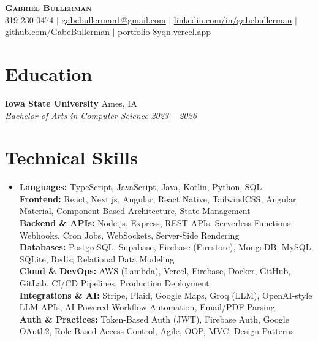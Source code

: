 \documentclass[letterpaper,10.5pt]{article}
\begin{document}
\begin{center}
  {\Huge \scshape \textbf{Gabriel Bullerman}} \\[3pt]
  \small
  319-230-0474 $|$
  \href{mailto:gabebullerman1@gmail.com}{\underline{gabebullerman1@gmail.com}} $|$
  \href{https://linkedin.com/in/gabebullerman}{\underline{linkedin.com/in/gabebullerman}} $|$
  \href{https://github.com/GabeBullerman}{\underline{github.com/GabeBullerman}} $|$
  \href{https://portfolio-8yqn.vercel.app/}{\underline{portfolio-8yqn.vercel.app}}
\end{center}

\vspace{-2pt}

\section{Education}
\textbf{Iowa State University} \hfill Ames, IA \\
\textit{Bachelor of Arts in Computer Science} \hfill \textit{2023 -- 2026}

\section{Technical Skills}
\begin{itemize}[leftmargin=0.15in, label={}, itemsep=1pt, topsep=2pt]
  \small\item
    \textbf{Languages:} TypeScript, JavaScript, Java, Kotlin, Python, SQL \\
    \textbf{Frontend:} React, Next.js, Angular, React Native, TailwindCSS, Angular Material, Component-Based Architecture, State Management \\
    \textbf{Backend \& APIs:} Node.js, Express, REST APIs, Serverless Functions, Webhooks, Cron Jobs, WebSockets, Server-Side Rendering \\
    \textbf{Databases:} PostgreSQL, Supabase, Firebase (Firestore), MongoDB, MySQL, SQLite, Redis; Relational Data Modeling \\
    \textbf{Cloud \& DevOps:} AWS (Lambda), Vercel, Firebase, Docker, GitHub, GitLab, CI/CD Pipelines, Production Deployment \\
    \textbf{Integrations \& AI:} Stripe, Plaid, Google Maps, Groq (LLM), OpenAI-style LLM APIs, AI-Powered Workflow Automation, Email/PDF Parsing \\
    \textbf{Auth \& Practices:} Token-Based Auth (JWT), Firebase Auth, Google OAuth2, Role-Based Access Control, Agile, OOP, MVC, Design Patterns
\end{itemize}
\end{document}
